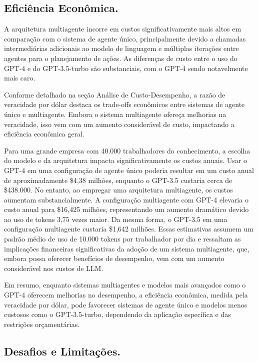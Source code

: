     
    
        \subsection{Eficiência Econômica.}
        
            A arquitetura multiagente incorre em custos significativamente mais altos em comparação com o sistema de agente único, principalmente devido a chamadas intermediárias adicionais ao modelo de linguagem e múltiplas iterações entre agentes para o planejamento de ações. As diferenças de custo entre o uso do GPT-4 e do GPT-3.5-turbo são substanciais, com o GPT-4 sendo notavelmente mais caro.
            
            Conforme detalhado na seção Análise de Custo-Desempenho, a razão de veracidade por dólar destaca os trade-offs econômicos entre sistemas de agente único e multiagente. Embora o sistema multiagente ofereça melhorias na veracidade, isso vem com um aumento considerável de custo, impactando a eficiência econômica geral.
            
            Para uma grande empresa com 40.000 trabalhadores do conhecimento, a escolha do modelo e da arquitetura impacta significativamente os custos anuais. Usar o GPT-4 em uma configuração de agente único poderia resultar em um custo anual de aproximadamente \$4,38 milhões, enquanto o GPT-3.5 custaria cerca de \$438.000. No entanto, ao empregar uma arquitetura multiagente, os custos aumentam substancialmente. A configuração multiagente com GPT-4 elevaria o custo anual para \$16,425 milhões, representando um aumento dramático devido ao uso de tokens 3,75 vezes maior. Da mesma forma, o GPT-3.5 em uma configuração multiagente custaria \$1,642 milhões. Essas estimativas assumem um padrão médio de uso de 10.000 tokens por trabalhador por dia e ressaltam as implicações financeiras significativas da adoção de um sistema multiagente, que, embora possa oferecer benefícios de desempenho, vem com um aumento considerável nos custos de LLM.
            
            Em resumo, enquanto sistemas multiagentes e modelos mais avançados como o GPT-4 oferecem melhorias no desempenho, a eficiência econômica, medida pela veracidade por dólar, pode favorecer sistemas de agente único e modelos menos custosos como o GPT-3.5-turbo, dependendo da aplicação específica e das restrições orçamentárias.
            
        \subsection{Desafios e Limitações.}  
        
